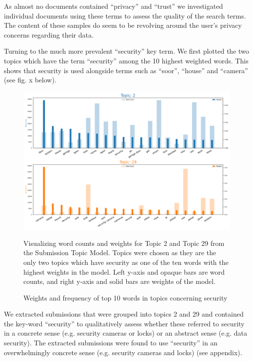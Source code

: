 \documentclass{article}
\begin{document}
    As almost no documents contained “privacy” and “trust” we investigated individual documents using these terms to assess the quality of the search terms. The content of these samples do seem to be revolving around the user’s privacy concerns regarding their data.
    
    Turning to the much more prevalent “security” key term. We first plotted the two topics which have the term “security” among the 10 highest weighted words. This shows that security is used alongside terms such as “soor”, “house” and “camera” (see fig. x below).
    
    \begin{figure}[H]
        \begin{centering}
        \includegraphics[scale=0.3]{../Figure/H2_topic_weight_prelim.png}
        \caption{Weights and frequency of top 10 words in topics concerning security}
        \end{centering}
        \begin{footnotesize} 
            Visualizing word counts and weights for Topic 2 and Topic 29 from the Submission Topic Model. Topics were chosen as they are the only two topics which have security as one of the ten words with the highest weights in the model. Left y-axis and opaque bars are word counts, and right y-axis and solid bars are weights of the model. 
        \end{footnotesize}
    \end{figure}

    We extracted submissions that were grouped into topics 2 and 29 and contained the key-word “security” to qualitatively assess whether these referred to security in a concrete sense (e.g. security cameras or locks) or an abstract sense (e.g. data security). The extracted submissions were found to use “security” in an overwhelmingly concrete sense (e.g. security cameras and locks) (see appendix). 
\end{document}
